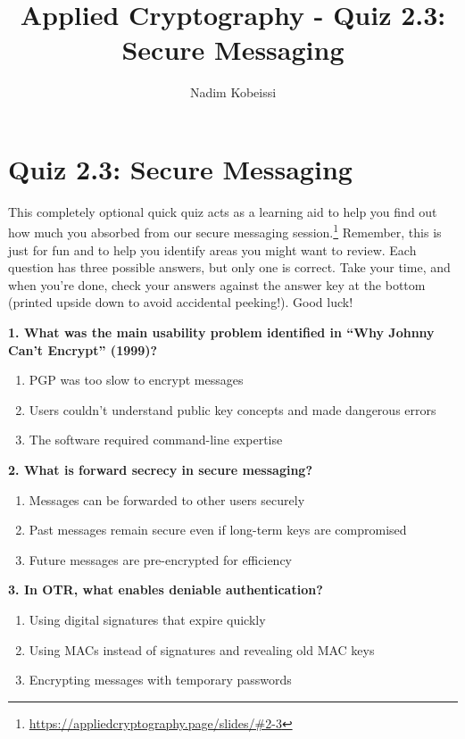 \documentclass[10pt,a4paper,american]{article}
\title{Applied Cryptography - Quiz 2.3: Secure Messaging}
\author{Nadim Kobeissi}
\begin{document}
\classhandoutheader
\section*{Quiz 2.3: Secure Messaging}

\begin{tcolorbox}[colframe=OliveGreen!30!white,colback=OliveGreen!5!white]
	This completely optional quick quiz acts as a learning aid to help you find out how much you absorbed from our secure messaging session.\footnote{\url{https://appliedcryptography.page/slides/\#2-3}} Remember, this is just for fun and to help you identify areas you might want to review. Each question has three possible answers, but only one is correct. Take your time, and when you're done, check your answers against the answer key at the bottom (printed upside down to avoid accidental peeking!). Good luck!
\end{tcolorbox}

\vspace{1em}

\textbf{1. What was the main usability problem identified in ``Why Johnny Can't Encrypt'' (1999)?}
\begin{enumerate}[label=\alph*)]
	\item PGP was too slow to encrypt messages
	\item Users couldn't understand public key concepts and made dangerous errors
	\item The software required command-line expertise
\end{enumerate}

\vspace{0.5em}

\textbf{2. What is forward secrecy in secure messaging?}
\begin{enumerate}[label=\alph*)]
	\item Messages can be forwarded to other users securely
	\item Past messages remain secure even if long-term keys are compromised
	\item Future messages are pre-encrypted for efficiency
\end{enumerate}

\vspace{0.5em}

\textbf{3. In OTR, what enables deniable authentication?}
\begin{enumerate}[label=\alph*)]
	\item Using digital signatures that expire quickly
	\item Using MACs instead of signatures and revealing old MAC keys
	\item Encrypting messages with temporary passwords
\end{enumerate}
\end{document}
